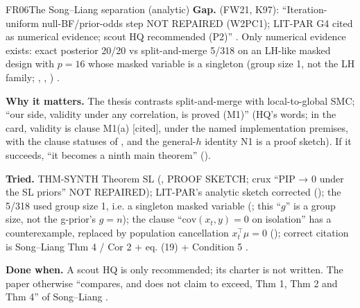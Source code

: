 \begin{card}{FR06}{The Song--Liang separation (analytic)}
\textbf{Gap.}  (FW21, K97): ``Iteration-uniform null-BF/prior-odds step NOT REPAIRED (W2PC1); LIT-PAR G4 cited as numerical evidence; scout HQ recommended (P2)'' . Only numerical evidence exists: exact posterior 20/20 vs split-and-merge 5/318 on an LH-like masked design with $p=16$ whose masked variable is a singleton (group size 1, not the LH family; , , ) .

\textbf{Why it matters.} The thesis  contrasts split-and-merge with local-to-global SMC; ``our side, validity under any correlation, is proved (M1)''  (HQ's words; in the card, validity is clause M1(a) [cited], under the named implementation premises, with the clause statuses of , and the general-$h$ identity N1 is a proof sketch). If it succeeds, ``it becomes a ninth main theorem'' ().

\textbf{Tried.} THM-SYNTH Theorem SL (, PROOF SKETCH; crux ``PIP → 0 under the SL priors'' NOT REPAIRED); LIT-PAR's analytic sketch corrected (); the 5/318 used group size 1, i.e. a singleton masked variable (; this ``$g$'' is a group size, not the g-prior's $g=n$); the clause ``$\mathrm{cov}(x_t,y)=0$ on isolation'' has a counterexample, replaced by population cancellation $x_t^\top\mu=0$ (); correct citation is Song--Liang Thm 4 / Cor 2 + eq. (19) + Condition 5 .

\textbf{Done when.} A scout HQ is only recommended; its charter is not written. The paper otherwise ``compares, and does not claim to exceed, Thm 1, Thm 2 and Thm 4'' of Song--Liang .
\end{card}

